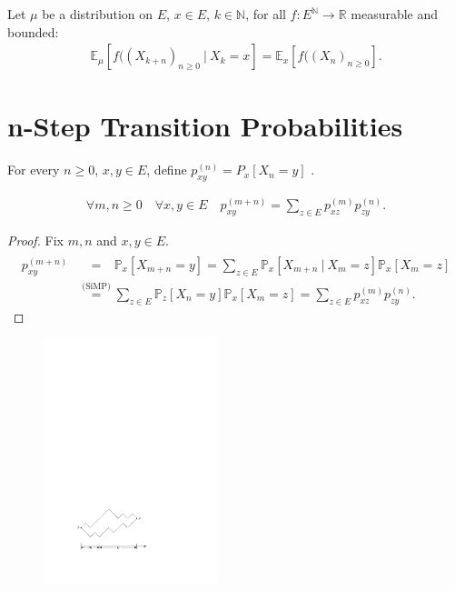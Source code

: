 \begin{cor}
Let $\mu$ be a  distribution on $E$, $x \in E$, $k \in \mathbb{N}$, for all $f: E^{\mathbb{N}} \to \mathbb{R}$ measurable and bounded:
\begin{align}
	\boxed{	\mathbb{E}_\mu \left[ f((X_{k+n})_{n \geq 0} \ | \ X_k =x \right] = \mathbb{E} _x \left[ f((X_n)_{n \geq 0} \right] .}  
\end{align}
\end{cor}

\noindent
\section{n-Step Transition Probabilities}
\begin{defn}
	For every $n\geq0$, $x, y \in E$, define $p_{xy}^{(n)}=P_x[X_n=y]$
.\end{defn}

\begin{prop}
\begin{align}
	\forall m,n \geq 0 \quad \forall x,y \in E \quad \boxed{ p_{xy}^{(m+n)}= \sum_{z \in E} p_{xz}^{(m)}p_{zy}^{(n)}.}
\end{align}
\end{prop}
\begin{proof}
Fix $m,n$ and $x,y \in E$.
	\begin{align}
		p_{xy}^{(m+n)} &\stackrel{\phantom{\textrm{(SiMP)}}}{=} 
			\mathbb{P}_{x} \left[ X_{m+n}=y \right] =
			\sum_{z \in E}^{} \mathbb{P}_{x} \left[ X_{m+n} \ | \ X_m = z \right] \mathbb{P}_{x} \left[ X_m = z \right] \\
		&\stackrel{\textrm{(SiMP)}}{=} \sum_{z \in E}^{} \mathbb{P}_{z} \left[ X_n=y \right] \mathbb{P}_{x} \left[ X_m=z \right] = \sum_{z \in E}^{} p_{xz}^{(m)} p_{zy}^{(n)}  	
	.\end{align}
\end{proof}

\begin{figure}[h]
	\centering
	\includegraphics[width=0.45\textwidth]{figures/CK.pdf}
\end{figure}


